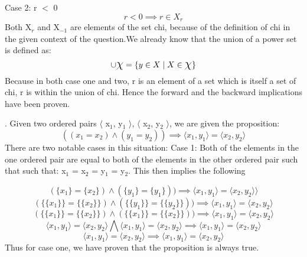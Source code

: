 \documentclass[11pt]{article}
\begin{document}
\begin{enumerate}
Case 2: r $<$ 0 
\begin{equation}
    r < 0 \implies r\in X_{r}
\end{equation}
Both X$_{r}$ and X$_{-1}$ are elements of the set chi, because of the definition of chi in the given context of the question.We already know that the union of a power set is defined as:
\begin{equation}
    \cup \mbox{\Large$\chi$} = \{y \in X \mid X \in \mbox{\Large$\chi$} \}
\end{equation}
Because in both case one and two, r is an element of a set which is itself a set of chi, r is within the union of chi. Hence the forward and the backward implications have been proven.

.
\newline 
Given two ordered pairs $\langle$ x$_{1}$, y$_{1}$ $\rangle$,  $\langle$ x$_{2}$, y$_{2}$ $\rangle$, we are given the proposition: 
\begin{equation}
    ((x_1 = x_2) \land (y_1 = y_2)) \implies \langle x_1, y_1 \rangle = \langle x_2, y_2 \rangle
\end{equation}
There are two notable cases in this situation: 
\newline 
\newline
Case 1: Both of the elements in the one ordered pair are equal to both of the elements in the other ordered pair such that such that:  x$_{1}$ = x$_{2}$ = y$_{1}$ = y$_{2}$. This then implies the following

\begin{equation}
      (  \{ x_1 \} =  \{  x_2  \}) \land (  \{  y_1 \}   =  \{  y_1 \}  ))  \implies  \langle x_1, y_1 \rangle = \langle x_2, y_2 \rangle \rangle
\end{equation}
\begin{equation}
      ( \{ \{ x_1 \} \} =  \{ \{ x_2 \} \}) \land (  \{ \{ y_1 \} \}=  \{ \{ y_2 \} \} ))  \implies  \langle x_1, y_1 \rangle = \langle x_2, y_2 \rangle
\end{equation}
\begin{equation}
      ( \{ \{ x_1 \} \} =  \{ \{ x_2 \} \}) \land (  \{ \{ x_1 \} \}=  \{ \{ x_2 \} \} ))  \implies  \langle x_1, y_1 \rangle = \langle x_2, y_2 \rangle
\end{equation}
\begin{equation}
    \langle x_1, y_1 \rangle =  \langle x_2, y_2 \rangle  \bigwedge    \langle x_1, y_1 \rangle =  \langle x_2, y_2 \rangle  \implies  \langle x_1, y_1 \rangle = \langle x_2, y_2 \rangle
\end{equation}
\begin{equation}
     \langle x_1, y_1 \rangle =  \langle x_2, y_2 \rangle \implies  \langle x_1, y_1 \rangle =  \langle x_2, y_2 \rangle
\end{equation}
Thus for case one, we have proven that the proposition is always true.


\end{enumerate}
\end{document}

